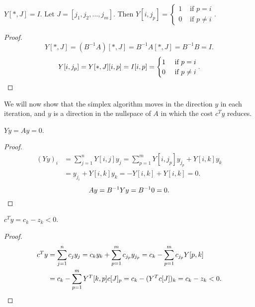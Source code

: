 \begin{lemma}
\label{thm:YJ-is-I}
$Y[*, J] = I$.
Let $J = [j_1, j_2, \ldots, j_m]$.
Then $Y[i, j_p] = \begin{cases}1 & \textrm{ if } p = i
\\ 0 & \textrm{ if } p \neq i\end{cases}$.
\end{lemma}
\begin{proof}
\[ Y[*, J] = (B^{-1}A)[*, J] = B^{-1}A[*, J] = B^{-1}B = I. \]
\[ Y[i, j_p] = Y[*, J][i, p] = I[i, p] = \begin{cases}1 & \textrm{ if } p = i
\\ 0 & \textrm{ if } p \neq i\end{cases}. \qedhere \]
\end{proof}

We will now show that the simplex algorithm moves in the direction $y$ in each iteration,
and $y$ is a direction in the nullspace of $A$ in which the cost $c^Ty$ reduces.

\begin{lemma}
\label{thm:y-in-nullsp}
$Yy = Ay = 0$.
\end{lemma}
\begin{proof}
\begin{align*}
(Yy)_i &= \sum_{j=1}^n Y[i, j]y_j
= \sum_{p=1}^m Y[i, j_p]y_{j_p} + Y[i, k]y_k
\\ &= y_{j_i} + Y[i, k]y_k
= -Y[i, k] + Y[i, k] = 0.
\end{align*}
\[ Ay = B^{-1}Yy = B^{-1}0 = 0. \qedhere \]
\end{proof}

\begin{lemma}
\label{thm:y-reduces-cost}
$c^Ty = c_k - z_k < 0$.
\end{lemma}
\begin{proof}
\begin{align*}
c^Ty &= \sum_{j=1}^n c_jy_j = c_ky_k + \sum_{p=1}^m c_{j_p}y_{j_p}
= c_k - \sum_{p=1}^m c_{j_p}Y[p, k]
\\ &= c_k - \sum_{p=1}^m Y^T[k, p]c[J]_p
= c_k - (Y^Tc[J])_k = c_k - z_k < 0.
\qedhere \end{align*}
\end{proof}

